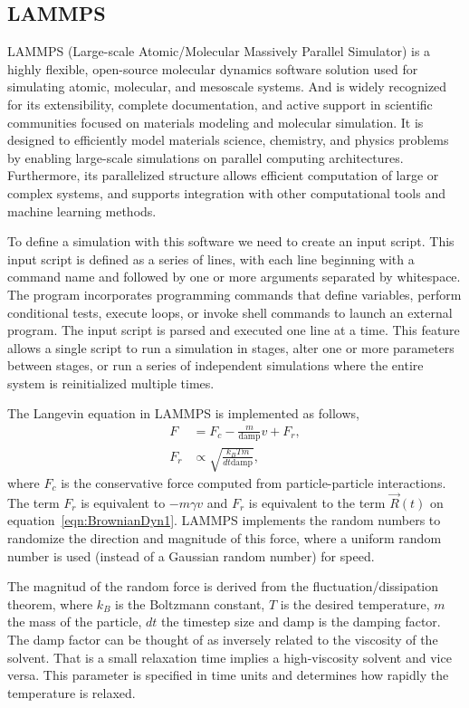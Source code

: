 \subsection{LAMMPS}

LAMMPS (Large-scale Atomic/Molecular Massively Parallel Simulator) is a highly flexible, open-source molecular dynamics software solution used for simulating atomic, molecular, and mesoscale systems. 
And is widely recognized for its extensibility, complete documentation, and active support in scientific communities focused on materials modeling and molecular simulation.
It is designed to efficiently model materials science, chemistry, and physics problems by enabling large-scale simulations on parallel computing architectures.
Furthermore, its parallelized structure allows efficient computation of large or complex systems, and supports integration with other computational tools and machine learning methods.

To define a simulation with this software we need to create an input script.
This input script is defined as a series of lines, with each line beginning with a command name and followed by one or more arguments separated by whitespace.
The program incorporates programming commands that define variables, perform conditional tests, execute loops, or invoke shell commands to launch an external program.
The input script is parsed and executed one line at a time. 
This feature allows a single script to run a simulation in stages, alter one or more parameters between stages, or run a series of independent simulations where the entire system is reinitialized multiple times.

The Langevin equation in LAMMPS is implemented as follows,
\begin{align}
    F &= F_c -\frac{m}{\mathrm{damp}}v + F_r, \\
    F_r &\propto\sqrt{\frac{k_B T m}{dt\mathrm{damp}}},
\end{align}
where $F_c$ is the conservative force computed from particle-particle interactions.
The term $F_r$ is equivalent to $-m\gamma v$ and $F_r$ is equivalent to the term $\vec{R}(t)$ on equation~\eqref{eqn:BrownianDyn1}.
LAMMPS implements the random numbers to randomize the direction and magnitude of this force, where a uniform random number is used (instead of a Gaussian random number) for speed.

The magnitud of the random force is derived from the fluctuation/dissipation theorem, where $k_B$ is the Boltzmann constant, $T$ is the desired temperature, $m$ the mass of the particle, $dt$ the timestep size and $\mathrm{damp}$ is the damping factor.
The damp factor can be thought of as inversely related to the viscosity of the solvent.
That is a small relaxation time implies a high-viscosity solvent and vice versa.
This parameter is specified in time units and determines how rapidly the temperature is relaxed.

